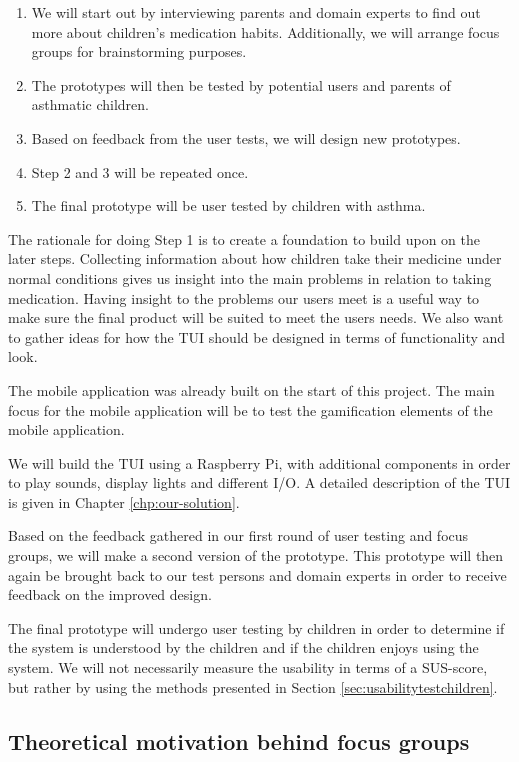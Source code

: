 \begin{enumerate}
  \item We will start out by interviewing parents and domain experts to find out more about children's medication habits. Additionally, we will arrange focus groups for brainstorming purposes.
  \item The prototypes will then be tested by potential users and parents of asthmatic children. 
  \item Based on feedback from the user tests, we will design new prototypes.
  \item Step 2 and 3 will be repeated once. 
  \item The final prototype will be user tested by children with asthma. 
\end{enumerate}
  
The rationale for doing Step 1 is to create a foundation to build upon on the later steps. 
Collecting information about how children take their medicine under normal conditions gives us insight into the main problems in relation to taking medication. Having insight to the problems our users meet is a useful way to make sure the final product will be suited to meet the users needs. We also want to gather ideas for how the TUI should be designed in terms of functionality and look.

The mobile application was already built on the start of this project. The main focus for the mobile application will be to test the gamification elements of the mobile application. 

We will build the TUI using a Raspberry Pi, with additional components in order to play sounds, display lights and different I/O. A detailed description of the TUI is given in Chapter \ref{chp:our-solution}. 


Based on the feedback gathered in our first round of user testing and focus groups, we will make a second version of the prototype. This prototype will then again be brought back to our test persons and domain experts in order to receive feedback on the improved design.

The final prototype will undergo user testing by children in order to determine if the system is understood by the children and if the children enjoys using the system. We will not necessarily measure the usability in terms of a SUS-score\cite{brooke1996sus}, but rather by using the methods presented in Section \ref{sec:usabilitytestchildren}.

\subsection{Theoretical motivation behind focus groups}


